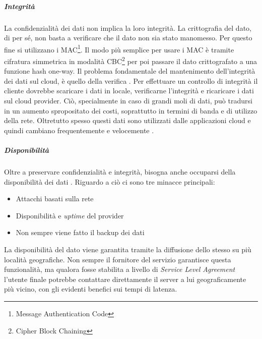 \documentclass[../main.tex]{subfiles}
\begin{document}
\subparagraph{Integrità}
La confidenzialità dei dati non implica la loro integrità. La crittografia del dato, di per sé, non basta a verificare che il dato non sia stato manomesso.
Per questo fine si utilizzano i MAC\footnote{Message Authentication Code}. Il modo più semplice per usare i MAC è tramite cifratura simmetrica in modalità CBC\footnote{Cipher Block Chaining} per poi passare il dato crittografato a una funzione hash one-way. 
Il problema fondamentale del mantenimento dell'integrità dei dati sul cloud, è quello della verifica \cite{CloudSecurityBook}.
Per effettuare un controllo di integrità il cliente dovrebbe scaricare i dati in locale, verificarne l'integrità e ricaricare i dati sul cloud provider. Ciò, specialmente in caso di grandi moli di dati, può tradursi in un aumento spropositato dei costi, soprattutto in termini di banda e di utilizzo della rete.
Oltretutto spesso questi dati sono utilizzati dalle applicazioni cloud e quindi cambiano frequentemente e velocemente \cite{CloudSecurityBook}.

\subparagraph{Disponibilità}
Oltre a preservare confidenzialità e integrità, bisogna anche occuparsi della disponibilità dei dati \cite{CloudSecurityBook}.
Riguardo a ciò ci sono tre minacce principali:
\begin{itemize}
\item Attacchi basati sulla rete
\item Disponibilità e \textit{uptime} del provider
\item Non sempre viene fatto il backup dei dati
\end{itemize}
La disponibilità del dato viene garantita tramite la diffusione dello stesso su più località geografiche. Non sempre il fornitore del servizio garantisce questa funzionalità, ma qualora fosse stabilita a livello di \textit{Service Level Agreement} l'utente finale potrebbe contattare direttamente il server a lui geograficamente più vicino, con gli evidenti benefici sui tempi di latenza.
\end{document}
